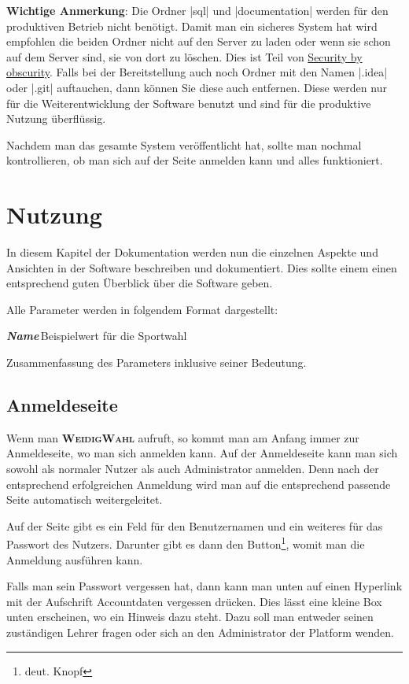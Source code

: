 \documentclass[ngerman]{ltxdoc}
\newcommand{\DescribeOption}[4]{
  \DescribeMacro{#1}
  \begin{minipage}[t]{\textwidth}
    \textit{\textbf{\textcolor{mLightGreen}{#2}}}\dotfill\,#3\par
    \begingroup
    \vspace{0.5em}#4\par
    \endgroup
  \end{minipage}
}
\newcommand{\name}{\textbf{\textsc{WeidigWahl}}\xspace}
\begin{document}
\textbf{Wichtige Anmerkung}: Die Ordner |sql| und |documentation| werden für den produktiven Betrieb nicht
benötigt. Damit man ein sicheres System hat wird empfohlen die beiden Ordner nicht
auf den Server zu laden oder wenn sie schon auf dem Server sind, sie von dort zu löschen.
Dies ist Teil von \href{https://de.wikipedia.org/wiki/Security_through_obscurity}{Security by obscurity}.
Falls bei der Bereitstellung auch noch Ordner mit den Namen |.idea| oder |.git| auftauchen,
dann können Sie diese auch entfernen. Diese werden nur für die Weiterentwicklung
der Software benutzt und sind für die produktive Nutzung überflüssig.

Nachdem man das gesamte System veröffentlicht hat, sollte man nochmal kontrollieren,
ob man sich auf der Seite anmelden kann und alles funktioniert.

\section{Nutzung}

In diesem Kapitel der Dokumentation werden nun die einzelnen Aspekte und Ansichten
in der Software beschreiben und dokumentiert. Dies sollte einem einen entsprechend
guten Überblick über die Software geben.

Alle Parameter werden in folgendem Format dargestellt:

\DescribeOption{Stichwort}{Name}{Beispielwert für die Sportwahl}{
  Zusammenfassung des Parameters inklusive seiner Bedeutung.
}

\subsection{Anmeldeseite}

Wenn man \name aufruft, so kommt man am Anfang immer zur Anmeldeseite, wo man sich
anmelden kann. Auf der Anmeldeseite kann man sich sowohl als normaler Nutzer als
auch Administrator anmelden. Denn nach der entsprechend erfolgreichen Anmeldung
wird man auf die entsprechend passende Seite automatisch weitergeleitet.

Auf der Seite gibt es ein Feld für den Benutzernamen und ein weiteres für das
Passwort des Nutzers. Darunter gibt es dann den Button\footnote{deut. Knopf}, womit
man die Anmeldung ausführen kann.

Falls man sein Passwort vergessen hat, dann kann man unten auf einen Hyperlink
mit der Aufschrift \glqq Accountdaten vergessen\grqq{} drücken. Dies lässt eine kleine
Box unten erscheinen, wo ein Hinweis dazu steht. Dazu soll man entweder seinen
zuständigen Lehrer fragen oder sich an den Administrator der Platform wenden.
\end{document}

